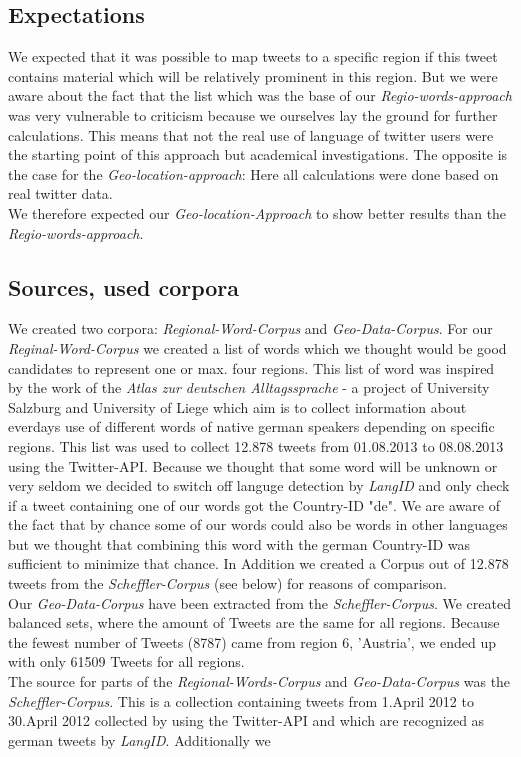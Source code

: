 \documentclass[../Main.tex]{subfiles}
\begin{document}
\subsection{Expectations}
We expected that it was possible to map tweets to a specific region if this tweet contains material which will be relatively prominent in this region. But we were aware about the fact that the list which was the base of our \emph{Regio-words-approach} was very vulnerable to criticism because we ourselves lay the ground for further calculations. This means that not the real use of language of twitter users were the starting point of this approach but academical investigations. The opposite is the case for the \emph{Geo-location-approach}: Here all calculations were done based on real twitter data.\\
We therefore expected our \emph{Geo-location-Approach} to show better results than the \emph{Regio-words-approach}.

\subsection{Sources, used corpora}
We created two corpora: \emph{Regional-Word-Corpus} and \emph{Geo-Data-Corpus}.
For our \emph{Reginal-Word-Corpus} we created a list of words which we thought would be good candidates to represent one or max. four regions. This list of word was inspired by the work of the \emph{Atlas zur deutschen Alltagssprache} - a project of University Salzburg and University of Liege which aim is to collect information about everdays use of different words of native german speakers depending on specific regions. This list was used to collect 12.878 tweets from 01.08.2013 to 08.08.2013 using the Twitter-API. Because we thought that some word will be unknown or very seldom we decided to switch off languge detection by \emph{LangID} and only check if a tweet containing one of our words got the Country-ID "de". We are aware of the fact that by chance some of our words could also be words in other languages but we thought that combining this word with the german Country-ID was sufficient to minimize that chance. In Addition we created a Corpus out of 12.878 tweets from the \emph{Scheffler-Corpus} (see below) for reasons of comparison.\\
Our \emph{Geo-Data-Corpus} have been extracted from the \emph{Scheffler-Corpus}.
We created balanced sets, where the amount of  Tweets are the same for all regions. Because the fewest number of Tweets (8787) came from region 6, 'Austria', we ended up with only 61509 Tweets for all regions.\\
The source for parts of the \emph{Regional-Words-Corpus} and \emph{Geo-Data-Corpus} was the \emph{Scheffler-Corpus}. This is a collection containing  tweets from 1.April 2012 to 30.April 2012 collected by using the Twitter-API and which are recognized as german tweets by \emph{LangID}.
Additionally we 
\end{document}
